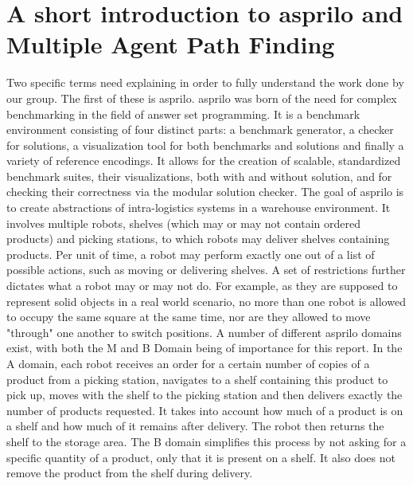 \documentclass{llncs}
\begin{document}
\section{A short introduction to asprilo and Multiple Agent Path Finding}

Two specific terms need explaining in order to fully understand the work done by our group. The first of these is asprilo.\newline\newline 
asprilo was born of the need for complex benchmarking in the field of answer set programming. It is a benchmark environment consisting of four distinct parts: a benchmark generator, a checker for solutions, a visualization tool for both benchmarks and solutions and finally a variety of reference encodings. It allows for the creation of scalable, standardized benchmark suites, their visualizations, both with and without solution, and for checking their correctness via the modular solution checker.\newline
The goal of asprilo is to create abstractions of intra-logistics systems in a warehouse environment. It involves multiple robots, shelves (which may or may not contain ordered products) and picking stations, to which robots may deliver shelves containing products. Per unit of time, a robot may perform exactly one out of a list of possible actions, such as moving or delivering shelves. \newline\newline
A set of restrictions further dictates what a robot may or may not do. For example, as they are supposed to represent solid objects in a real world scenario, no more than one robot is allowed to occupy the same square at the same time, nor are they allowed to move "through" one another to switch positions. A number of different asprilo domains exist, with both the M and B Domain being of importance for this report. \newline
In the A domain, each robot receives an order for a certain number of copies of a product from a picking station, navigates to a shelf containing this product to pick up, moves with the shelf to the picking station and then delivers exactly the number of products requested. It takes into account how much of a product is on a shelf and how much of it remains after delivery. The robot then returns the shelf to the storage area.\newline
The B domain simplifies this process by not asking for a specific quantity of a product, only that it is present on a shelf. It also does not remove the product from the shelf during delivery.\newline\newline
\end{document}
